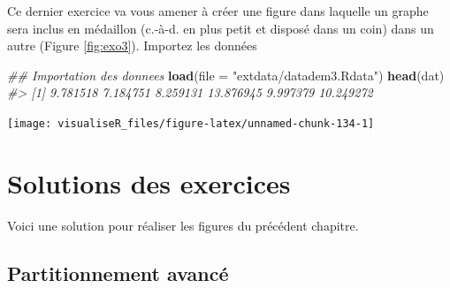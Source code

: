 \documentclass[]{article}
\newenvironment{Shaded}{\begin{snugshade}}{\end{snugshade}}
\newcommand{\CommentTok}[1]{\textcolor[rgb]{0.56,0.35,0.01}{\textit{#1}}}
\newcommand{\DataTypeTok}[1]{\textcolor[rgb]{0.13,0.29,0.53}{#1}}
\newcommand{\KeywordTok}[1]{\textcolor[rgb]{0.13,0.29,0.53}{\textbf{#1}}}
\newcommand{\NormalTok}[1]{#1}
\newcommand{\StringTok}[1]{\textcolor[rgb]{0.31,0.60,0.02}{#1}}
\begin{document}
Ce dernier exercice va vous amener à créer une figure dans laquelle un graphe sera inclus en médaillon (c.-à-d. en plus petit et disposé dans un coin) dans un autre (Figure \ref{fig:exo3}). Importez les données

\begin{Shaded}
\begin{Highlighting}[]
\CommentTok{## Importation des donnees}
\KeywordTok{load}\NormalTok{(}\DataTypeTok{file =} \StringTok{"extdata/datadem3.Rdata"}\NormalTok{)}
\KeywordTok{head}\NormalTok{(dat)}
\CommentTok{#> [1]  9.781518  7.184751  8.259131 13.876945  9.997379 10.249272}
\end{Highlighting}
\end{Shaded}

\begin{center}\texttt{[image: visualiseR\_files/figure-latex/unnamed-chunk-134-1]} \end{center}

\hypertarget{solutions-des-exercices}{%
\section{Solutions des exercices}\label{solutions-des-exercices}}

Voici une solution pour réaliser les figures du précédent chapitre.

\hypertarget{partitionnement-avancuxe9-2}{%
\subsection{Partitionnement avancé}\label{partitionnement-avancuxe9-2}}
\end{document}
